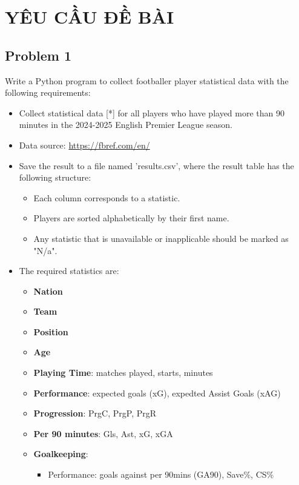\documentclass[12pt, letterpaper]{article}
\begin{document}
\cleardoublepage

\section{YÊU CẦU ĐỀ BÀI}
\setcounter{section}{0}
\subsection{Problem 1}
Write a Python program to collect footballer player statistical data with the following
requirements:
\begin{itemize}
    \item Collect statistical data [*] for all players who have played more than 90 minutes in the
2024-2025 English Premier League season.
    \item Data source: \url{https://fbref.com/en/}
    \item Save the result to a file named 'results.csv', where the result table has the following
structure:
    \begin{itemize}[label=$\circ$]
        \item Each column corresponds to a statistic.
        \item Players are sorted alphabetically by their first name.
        \item Any statistic that is unavailable or inapplicable should be marked as "N/a".
    \end{itemize}
    \item The required statistics are:
    \begin{itemize}[label=$\circ$]
        \item \textbf{Nation}
        \item \textbf{Team}
        \item \textbf{Position}
        \item \textbf{Age}
        \item \textbf{Playing Time}: matches played, starts, minutes
        \item \textbf{Performance}:  expected goals (xG), expedted Assist Goals (xAG)
        \item \textbf{Progression}: PrgC, PrgP, PrgR
        \item \textbf{Per 90 minutes}: Gls, Ast, xG, xGA
        \item \textbf{Goalkeeping}:
        \begin{itemize}
            \item Performance: goals against per 90mins (GA90), Save\%, CS\%

\end{itemize}
\end{itemize}
\end{itemize}
\end{document}
